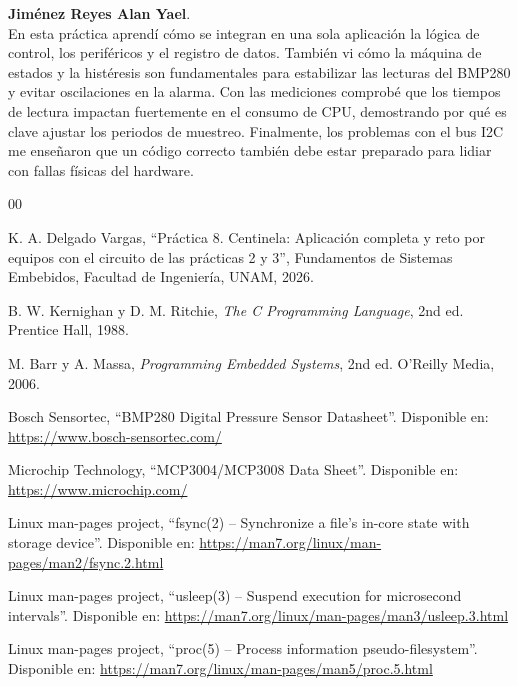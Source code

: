 \documentclass[conference]{IEEEtran}
\begin{document}
\vspace{0.35cm}

\textbf{Jiménez Reyes Alan Yael}.\\
En esta práctica aprendí cómo se integran en una sola aplicación la lógica de control, los periféricos y el registro de datos. También vi cómo la máquina de estados y la histéresis son fundamentales para estabilizar las lecturas del BMP280 y evitar oscilaciones en la alarma. Con las mediciones comprobé que los tiempos de lectura impactan fuertemente en el consumo de CPU, demostrando por qué es clave ajustar los periodos de muestreo. Finalmente, los problemas con el bus I2C me enseñaron que un código correcto también debe estar preparado para lidiar con fallas físicas del hardware.


\begin{thebibliography}{00}

K. A. Delgado Vargas,
``Práctica 8. Centinela: Aplicación completa y reto por equipos con el circuito de las prácticas 2 y 3'',
Fundamentos de Sistemas Embebidos,
Facultad de Ingeniería, UNAM, 2026.

B. W. Kernighan y D. M. Ritchie,
\textit{The C Programming Language},
2nd ed. Prentice Hall, 1988.

M. Barr y A. Massa,
\textit{Programming Embedded Systems},
2nd ed. O'Reilly Media, 2006.

Bosch Sensortec,
``BMP280 Digital Pressure Sensor Datasheet''.
Disponible en:
\url{https://www.bosch-sensortec.com/}

Microchip Technology,
``MCP3004/MCP3008 Data Sheet''.
Disponible en:
\url{https://www.microchip.com/}

Linux man-pages project,
``fsync(2) -- Synchronize a file's in-core state with storage device''.
Disponible en:
\url{https://man7.org/linux/man-pages/man2/fsync.2.html}

Linux man-pages project,
``usleep(3) -- Suspend execution for microsecond intervals''.
Disponible en:
\url{https://man7.org/linux/man-pages/man3/usleep.3.html}

Linux man-pages project,
``proc(5) -- Process information pseudo-filesystem''.
Disponible en:
\url{https://man7.org/linux/man-pages/man5/proc.5.html}

\end{thebibliography}
\end{document}
